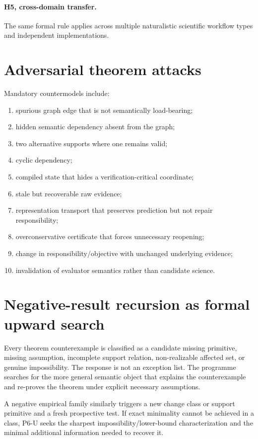 \documentclass[11pt]{article}
\begin{document}
\paragraph{H5, cross-domain transfer.}
The same formal rule applies across multiple naturalistic scientific workflow types and independent implementations.

\section{Adversarial theorem attacks}
Mandatory countermodels include:
\begin{enumerate}
    \item spurious graph edge that is not semantically load-bearing;
    \item hidden semantic dependency absent from the graph;
    \item two alternative supports where one remains valid;
    \item cyclic dependency;
    \item compiled state that hides a verification-critical coordinate;
    \item stale but recoverable raw evidence;
    \item representation transport that preserves prediction but not repair responsibility;
    \item overconservative certificate that forces unnecessary reopening;
    \item change in responsibility/objective with unchanged underlying evidence;
    \item invalidation of evaluator semantics rather than candidate science.
\end{enumerate}

\section{Negative-result recursion as formal upward search}
Every theorem counterexample is classified as a candidate missing primitive, missing assumption, incomplete support relation, non-realizable affected set, or genuine impossibility. The response is not an exception list. The programme searches for the more general semantic object that explains the counterexample and re-proves the theorem under explicit necessary assumptions.

A negative empirical family similarly triggers a new change class or support primitive and a fresh prospective test. If exact minimality cannot be achieved in a class, P6-U seeks the sharpest impossibility/lower-bound characterization and the minimal additional information needed to recover it.
\end{document}
